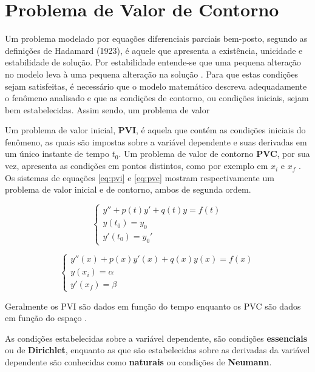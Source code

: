 \documentclass[
    12pt,               %
    openright,          %
    oneside,
    a4paper,            %
    english,            %
    french,             %
    spanish,            %
    brazil              %
    ]{abntex2}
\begin{document}
\section{Problema de Valor de Contorno}


Um problema modelado por equações diferenciais parciais bem-posto, segundo as definições de Hadamard (1923), é aquele que   apresenta a existência, unicidade e estabilidade de solução. Por estabilidade entende-se que uma pequena alteração no modelo leva à uma pequena alteração na solução . Para que estas condições sejam satisfeitas, é necessário que o modelo matemático descreva adequadamente o fenômeno analisado e que as condições de contorno, ou condições iniciais, sejam bem estabelecidas. Assim sendo, um problema de valor 

Um problema de valor inicial, \textbf{PVI}, é aquela que contém as condições iniciais do fenômeno, as quais são impostas sobre a variável dependente e suas derivadas em um único instante de tempo $t_0$. Um problema de valor de contorno \textbf{PVC}, por sua vez, apresenta as condições em pontos distintos, como por exemplo em $x_i$ e $x_f$ \cite[p. 447]{boyceDiprima}. Os sistemas de equações \ref{eq:pvi} e \ref{eq:pvc} mostram respectivamente um problema de valor inicial e de contorno, ambos de segunda ordem.

\begin{equation}
    \label{eq:pvi}
    \begin{cases}
        y'' + p(t)y' + q(t)y = f(t) \\
        y(t_0) = y_0 \\
        y'(t_0) = y_0'
    \end{cases}
\end{equation}


\begin{equation}
    \label{eq:pvc}
    \begin{cases}
        y''(x) + p(x)y'(x) + q(x)y(x) = f(x) \\
        y(x_i) = \alpha \\
        y'(x_f) = \beta
    \end{cases}
\end{equation}

Geralmente os PVI são dados em função do tempo enquanto os PVC são dados em função do espaço \cite[p. 447]{boyceDiprima}.

As condições estabelecidas sobre a variável dependente, são condições \textbf{essenciais} ou de \textbf{Dirichlet}, enquanto as que são estabelecidas sobre as derivadas da variável dependente são  conhecidas como \textbf{naturais} ou condições de \textbf{Neumann}.
\end{document}
